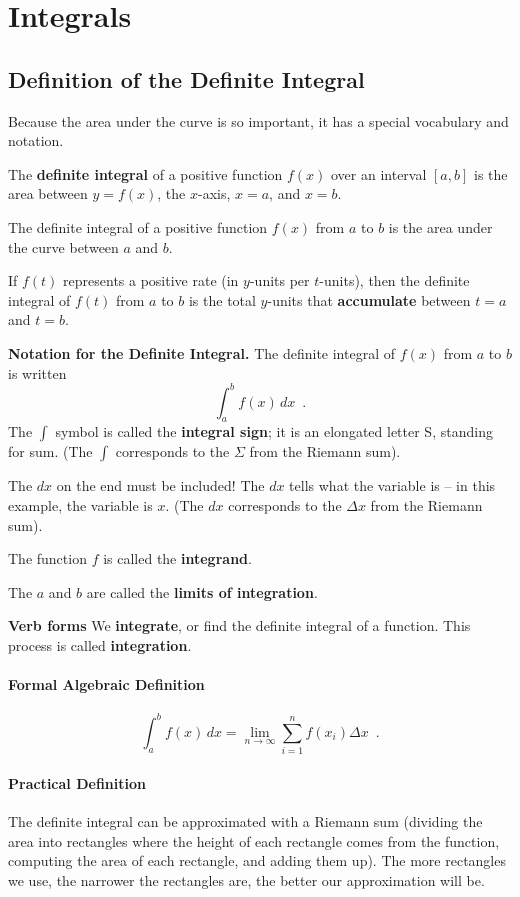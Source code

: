 \section{Integrals}
\label{sec:integrals}
\subsection{Definition of the Definite Integral}
Because the area under the curve is so important, it has a special vocabulary and notation.

\begin{definition}
The {\bf definite integral} of a positive function $f(x)$ over an interval $[a,b]$ is the area between $y=f(x)$, the $x$-axis, $x=a$, and $x=b$.

The definite integral of a positive function $f(x)$ from $a$ to $b$ is the area under the curve between $a$ and $b$.

If $f(t)$ represents a positive rate (in $y$-units per $t$-units), then the definite integral of $f(t)$ from $a$ to $b$ is the total $y$-units that {\bf accumulate} between $t=a$ and $t=b$.

{\bf Notation for the Definite Integral.} The definite integral of $f(x)$ from $a$ to $b$ is written
$$\int_a^b f(x)\,dx \enspace .$$
The $\int$ symbol is called the {\bf integral sign}; it is an elongated letter S, standing for sum. (The $\int$ corresponds to the $\Sigma$ from the Riemann sum).

The $dx$ on the end must be included! The $dx$ tells what the variable is – in this example, the variable is $x$. (The $dx$ corresponds to the $\Delta x$ from the Riemann sum).

The function $f$ is called the {\bf integrand}.

The $a$ and $b$ are called the {\bf limits of integration}.

{\bf Verb forms}
We {\bf integrate}, or find the definite integral of a function. This process is called {\bf integration}.

\paragraph{Formal Algebraic Definition}
$$\int_a^b f(x)\,dx = \lim_{n\to\infty} \sum_{i=1}^n f(x_i)\Delta x \enspace .$$
\paragraph{Practical Definition}
The definite integral can be approximated with a Riemann sum (dividing the area into rectangles where the height of each rectangle comes from the function, computing the area of each rectangle, and adding them up). The more rectangles we use, the narrower the rectangles are, the better our approximation will be.


\end{definition}
